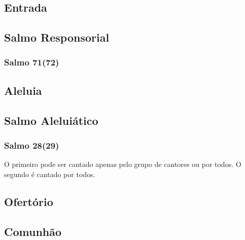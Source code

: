 
\subsection{Entrada}\label{subsection:tempus-per-annum/domini-nostri-iesu-christi-universorum-regis/introitus}

\AllowPageFlush

\subsection[Salmo Responsorial]{Salmo Responsorial}\label{subsection:tempus-nativitatis/in-epiphania-domini/psalmus-responsorius}
\subsubsection{Salmo 71(72)}

\AllowPageFlush

\subsection{Aleluia}\label{subsection:tempus-nativitatis/in-epiphania-domini/alleluia}

\AllowPageFlush

\subsection[Salmo Aleluiático]{Salmo Aleluiático}\label{subsection:tempus-nativitatis/in-epiphania-domini/psalmus-alleluiaticus}
\subsubsection{Salmo 28(29)}
\begin{rubrica}
  O primeiro {\normalfont\Rbar} pode ser cantado apenas pelo grupo de cantores ou por todos. O segundo {\normalfont\Rbar} é cantado por todos.
\end{rubrica}

\AllowPageFlush

\subsection{Ofertório}\label{subsection:tempus-per-annum/domini-nostri-iesu-christi-universorum-regis/offertorium}

\AllowPageFlush

\subsection{Comunhão}\label{subsection:tempus-per-annum/domini-nostri-iesu-christi-universorum-regis/communio}

